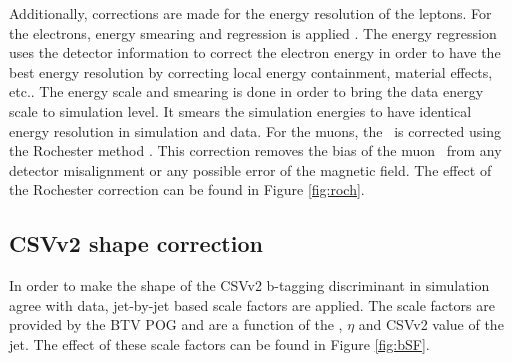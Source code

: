 Additionally, corrections are made for the energy resolution of the leptons. For the electrons, energy smearing and regression is applied \cite{smearing}. The energy regression uses the detector information to correct the electron energy in order to have the best energy resolution by correcting local energy containment, material effects, etc.. The energy scale and smearing is done in order to bring the data energy scale to simulation level. It smears the simulation energies to have identical energy resolution in simulation and data. For the muons, the \pt\ is corrected using the Rochester method \cite{roch,roch2}. This correction removes the bias of the muon \pt\ from any detector misalignment or any possible error of the magnetic field.
The effect of the Rochester correction can be found in Figure \ref{fig:roch}.
%
%	

\clearpage
\subsection*{CSVv2 shape correction}
In order to make the shape of the CSVv2 b-tagging discriminant in simulation agree with data,  jet-by-jet based scale factors are applied. The scale factors are provided by the BTV POG \cite{btag} and are a function of the \pt, $\eta$ and CSVv2 value of the jet.  The effect of these scale factors can be found in Figure \ref{fig:bSF}.



